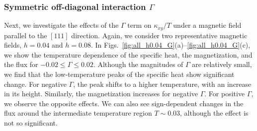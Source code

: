\documentclass[twocolumn,superscriptaddress,showpacs, longbibliography, aps, prb]{revtex4-2}
\newcommand{\blue}[1]{\textcolor{blue}{#1}}
\newcommand{\orange}[1]{\textcolor{orange}{#1}}
\begin{document}


\subsubsection{Symmetric off-diagonal interaction $\Gamma$} 
Next, we investigate the effects of the 
$\Gamma$ term on $\kappa_{xy}/T$ under a magnetic field parallel to the $[111]$ direction. 
Again, we consider two representative magnetic fields, $h=0.04$ and $h=0.08$.
In Figs.~\ref{fig:all_h0.04_G}(a)--\ref{fig:all_h0.04_G}(c), we show the temperature dependence 
of the specific heat, the magnetization, and the flux for $-0.02\leq\Gamma\leq0.02$. Although the %
magnitudes of $\Gamma$ are relatively small, 
we find that the low-temperature peaks of the specific heat show 
significant change. %
For negative $\Gamma$, the peak %
shifts to a higher temperature, with an increase in its height.
Similarly, the magnetization increases for negative $\Gamma$. 
For positive $\Gamma$, we observe the opposite effects.
We can also see sign-dependent changes in the flux around the intermediate temperature region $T\sim0.03$, 
although %
the effect is not so significant. 
\end{document}
